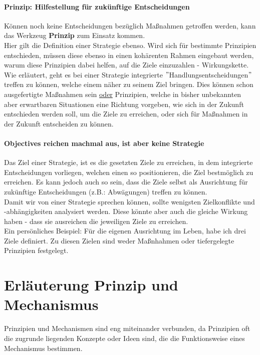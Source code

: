 \paragraph{Prinzip: Hilfestellung für zukünftige Entscheidungen}
Können noch keine Entscheidungen bezüglich Maßnahmen getroffen werden, kann das Werkzeug \textbf{Prinzip} zum Einsatz kommen.\\

Hier gilt die Definition einer Strategie ebenso. Wird sich für bestimmte Prinzipien entschieden, müssen diese ebenso in einen kohärenten Rahmen eingebaut werden, warum diese Prinzipien dabei helfen, auf die Ziele einzuzahlen - Wirkungskette.\\

Wie erläutert, geht es bei einer Strategie integrierte $"$Handlungsentscheidungen$"$ treffen zu können, welche einem näher zu seinem Ziel bringen. Dies können schon ausgefertigte Maßnahmen sein \underline{oder} Prinzipien, welche in bisher unbekannten aber erwartbaren Situationen eine Richtung vorgeben, wie sich in der Zukunft entschieden werden soll, um die Ziele zu erreichen, oder sich für Maßnahmen in der Zukunft entscheiden zu können.

\paragraph{Objectives reichen machmal aus, ist aber keine Strategie}
Das Ziel einer Strategie, ist es die gesetzten Ziele zu erreichen, in dem integrierte Entscheidungen vorliegen, welchen einen so positionieren, die Ziel bestmöglich zu erreichen. Es kann jedoch auch so sein, dass die Ziele selbst als Ausrichtung für zukünftige Entscheidungen (z.B.: Abwägungen) treffen zu können.\\

Damit wir von einer Strategie sprechen können, sollte wenigsten Zielkonflikte und -abhängigkeiten analysiert werden. Diese könnte aber auch die gleiche Wirkung haben - dass sie ausreichen die jeweiligen Ziele zu erreichen.\\

Ein persönliches Beispiel: Für die eigenen Ausrichtung im Leben, habe ich drei Ziele definiert. Zu diesen Zielen sind weder Maßnhahmen oder tiefergelegte Prinzipien festgelegt.

\section{Erläuterung Prinzip und Mechanismus}\label{Appendix_Erlaeuterung_Prinzip} Prinzipien und Mechanismen sind eng miteinander verbunden, da Prinzipien oft die zugrunde liegenden Konzepte oder Ideen sind, die die Funktionsweise eines Mechanismus bestimmen.\\

